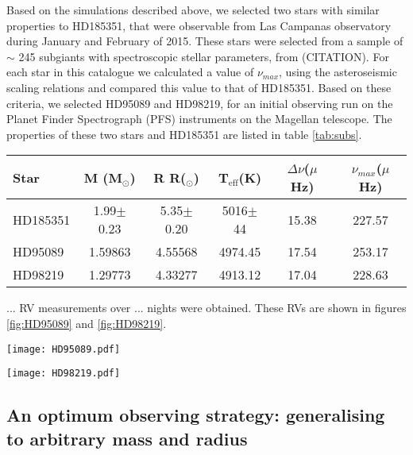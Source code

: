 \documentclass[useAMS, usenatbib]{aastex}
\begin{document}
Based on the simulations described above, we selected two stars with similar
properties to HD185351, that were observable from Las Campanas observatory
during January and February of 2015.
These stars were selected from a sample of $\sim$ 245 subgiants with
spectroscopic stellar parameters, from (CITATION).
For each star in this catalogue we calculated a value of $\nu_{max}$,
using the asteroseismic scaling relations and compared this value to that of
HD185351.
Based on these criteria, we selected HD95089 and HD98219, for an initial
observing run on the Planet Finder Spectrograph (PFS) instruments on the
Magellan telescope.
The properties of these two stars and HD185351 are listed in table
\ref{tab:subs}.

\begin{table*}
\caption{Spectroscopic and theoretical stellar parameters of HD185351 and the
two stars targeted in the initial PFS campaign.}
\begin{tabular}{lccccc}
\hline\hline
Star & M (M$_\odot$) & R R($_\odot$) & T$_{\mathrm{eff}}$(K)
& $\Delta \nu$($\mu$Hz) & $\nu_{max}$($\mu$Hz) \\
    \hline
    HD185351 & 1.99$\pm$0.23 & 5.35$\pm$0.20 & 5016$\pm$44 & 15.38 & 227.57 \\
HD95089  & 1.59863 & 4.55568 & 4974.45 & 17.54 & 253.17 \\
HD98219  & 1.29773 & 4.33277 & 4913.12 & 17.04 & 228.63 \\
\hline
\end{tabular}
\label{tab:subs}
\end{table*}

... RV measurements over ... nights were obtained.
These RVs are shown in figures \ref{fig:HD95089} and \ref{fig:HD98219}.

\begin{figure*}
\begin{center}
\texttt{[image: HD95089.pdf]}
\caption{RV observations of the subgiant HD95089.}
\label{fig:HD95089}
\end{center}
\end{figure*}

\begin{figure*}
\begin{center}
\texttt{[image: HD98219.pdf]}
\caption{RV observations of the subgiant HD98219.}
\label{fig:HD98219}
\end{center}
\end{figure*}

\subsection{An optimum observing strategy: generalising to arbitrary mass and
radius}
\end{document}
